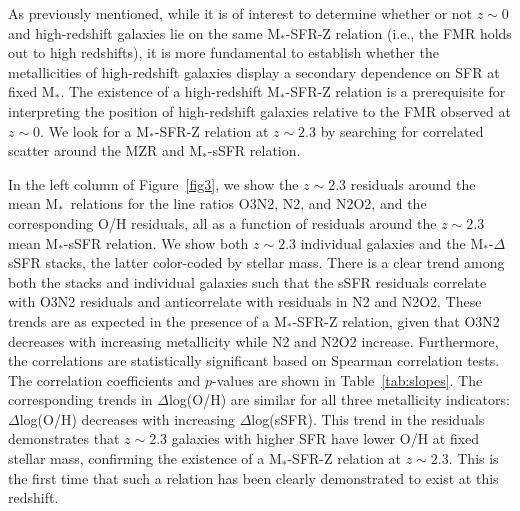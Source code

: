 \documentclass[iop,twocolappendix]{emulateapj}
\newcommand{\mstar}{$\mbox{M}_*$}
\begin{document}
As previously mentioned, while it is of interest to determine whether or not $z\sim0$
 and high-redshift galaxies lie on the same \mstar-SFR-Z relation
 (i.e., the FMR holds out to high redshifts), it is more fundamental to
 establish whether the metallicities of high-redshift galaxies display a secondary
 dependence on SFR at fixed \mstar.  The existence of a high-redshift \mstar-SFR-Z
 relation is a prerequisite for interpreting the position of high-redshift galaxies
 relative to the FMR observed at $z\sim0$.  We look for a \mstar-SFR-Z relation at
 $z\sim2.3$ by searching for correlated scatter around the MZR and \mstar-sSFR relation.

In the left column of Figure~\ref{fig3}, we show the $z\sim2.3$ residuals around the
 mean \mstar\ relations for the line ratios O3N2, N2, and N2O2, and the corresponding O/H residuals,
 all as a function of residuals around the $z\sim2.3$ mean \mstar-sSFR relation.
  We show both $z\sim2.3$ individual galaxies and the \mstar-$\Delta$sSFR stacks,
 the latter color-coded by stellar mass.
  There is a clear trend among both the stacks and individual galaxies such that
 the sSFR residuals correlate with O3N2 residuals and anticorrelate with residuals in N2 and N2O2.
  These trends are as expected in the presence of a \mstar-SFR-Z relation, given that O3N2 decreases
 with increasing metallicity while N2 and N2O2 increase.
  Furthermore, the correlations are statistically significant based on Spearman correlation tests.
  The correlation coefficients and $p$-values are shown in Table~\ref{tab:slopes}.
  The corresponding trends in $\Delta$log(O/H) are similar for all three metallicity indicators:
 $\Delta$log(O/H) decreases with increasing $\Delta$log(sSFR).  This trend in the residuals demonstrates
 that $z\sim2.3$ galaxies with higher SFR have lower O/H at fixed stellar mass,
 confirming the existence of a \mstar-SFR-Z relation at $z\sim2.3$.  This is the first time that such
 a relation has been clearly demonstrated to exist at this redshift.
\end{document}
